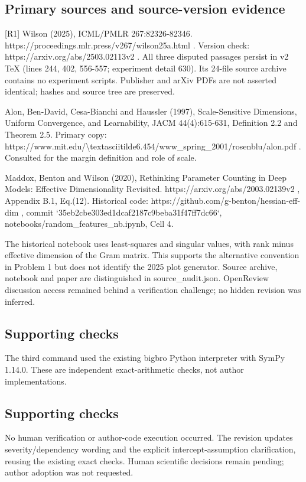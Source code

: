 \documentclass[10pt]{article}
\begin{document}
\subsection*{Primary sources and source-version evidence}
[R1] Wilson (2025), ICML/PMLR 267:82326-82346. https://proceedings.mlr.press/v267/wilson25a.html . Version check: https://arxiv.org/abs/2503.02113v2 . All three disputed passages persist in v2 TeX (lines 244, 402, 556-557; experiment detail 630). Its 24-file source archive contains no experiment scripts. Publisher and arXiv PDFs are not asserted identical; hashes and source tree are preserved.\par
[R2] Alon, Ben-David, Cesa-Bianchi and Haussler (1997), Scale-Sensitive Dimensions, Uniform Convergence, and Learnability, JACM 44(4):615-631, Definition 2.2 and Theorem 2.5. Primary copy: https://www.mit.edu/\textbackslash{}textasciitilde6.454/www\_spring\_2001/rosenblu/alon.pdf . Consulted for the margin definition and role of scale.\par
[R3] Maddox, Benton and Wilson (2020), Rethinking Parameter Counting in Deep Models: Effective Dimensionality Revisited. https://arxiv.org/abs/2003.02139v2 , Appendix B.1, Eq.(12). Historical code: https://github.com/g-benton/hessian-eff-dim , commit `35eb2cbe303ed1dcaf2187c9beba31f47ff7dc66`, notebooks/random\_features\_nb.ipynb, Cell 4.\par
The historical notebook uses least-squares and singular values, with rank minus effective dimension of the Gram matrix. This supports the alternative convention in Problem 1 but does not identify the 2025 plot generator. Source archive, notebook and paper are distinguished in source\_audit.json. OpenReview discussion access remained behind a verification challenge; no hidden revision was inferred.\par
\subsection*{Supporting checks}
The third command used the existing bigbro Python interpreter with SymPy 1.14.0. These are independent exact-arithmetic checks, not author implementations.\par
\subsection*{Supporting checks}
No human verification or author-code execution occurred. The revision updates severity/dependency wording and the explicit intercept-assumption clarification, reusing the existing exact checks. Human scientific decisions remain pending; author adoption was not requested.\par
\end{document}
